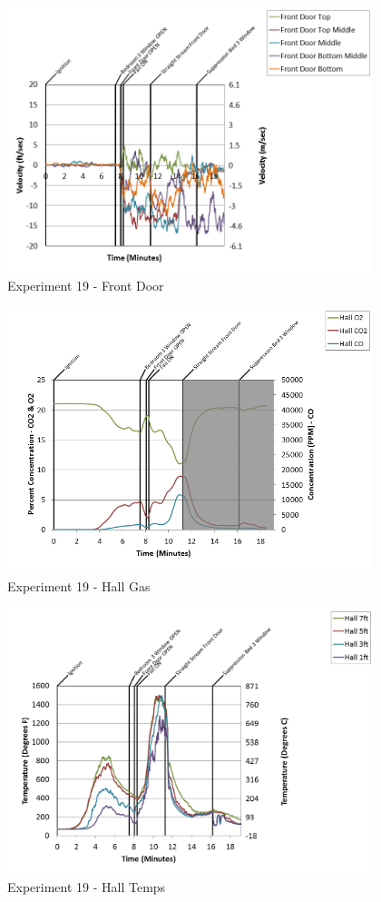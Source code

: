 \documentclass{article}
\begin{document}
\begin{appendices}
\clearpage

\begin{figure}[h!]
	\centering
	\includegraphics[height=3.05in]{0_Images/Results_Charts/Exp_19_Charts/FrontDoor.png}
	\caption{Experiment 19 - Front Door}
\end{figure}


\begin{figure}[h!]
	\centering
	\includegraphics[height=3.05in]{0_Images/Results_Charts/Exp_19_Charts/HallGas.png}
	\caption{Experiment 19 - Hall Gas}
\end{figure}

\clearpage

\begin{figure}[h!]
	\centering
	\includegraphics[height=3.05in]{0_Images/Results_Charts/Exp_19_Charts/HallTemps.png}
	\caption{Experiment 19 - Hall Temps}
\end{figure}



\end{appendices}
\end{document}
